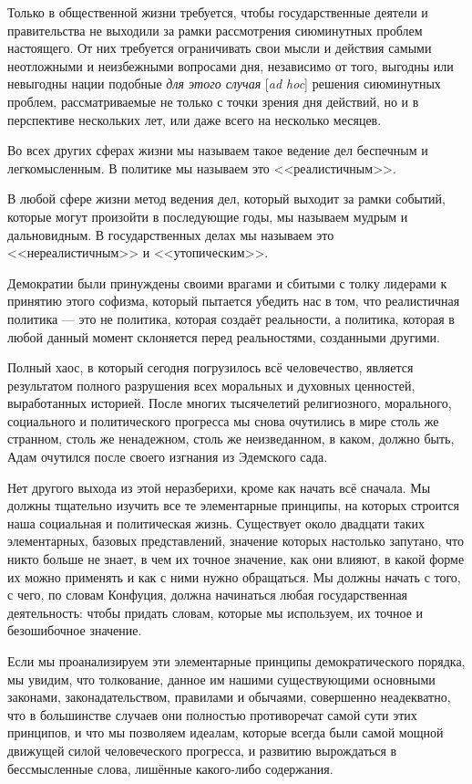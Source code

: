 Только в общественной жизни требуется, чтобы государственные деятели и правительства не выходили за рамки рассмотрения сиюминутных проблем настоящего. От них требуется ограничивать свои мысли и действия самыми неотложными и неизбежными вопросами дня, независимо от того, выгодны или невыгодны нации подобные \textit{для этого случая} [\textit{ad hoc}] решения сиюминутных проблем, рассматриваемые не только с точки зрения дня действий, но и в перспективе нескольких лет, или даже всего на несколько месяцев.

Во всех других сферах жизни мы называем такое ведение дел беспечным и легкомысленным. В политике мы называем это <<реалистичным>>.

В любой сфере жизни метод ведения дел, который выходит за рамки событий, которые могут произойти в последующие годы, мы называем мудрым и дальновидным. В государственных делах мы называем это <<нереалистичным>> и <<утопическим>>.

Демократии были принуждены своими врагами и сбитыми с толку лидерами к принятию этого софизма, который пытается убедить нас в том, что реалистичная политика — это не политика, которая создаёт реальности, а политика, которая в любой данный момент склоняется перед реальностями, созданными другими.

Полный хаос, в который сегодня погрузилось всё человечество, является результатом полного разрушения всех моральных и духовных ценностей, выработанных историей. После многих тысячелетий религиозного, морального, социального и политического прогресса мы снова очутились в мире столь же странном, столь же ненадежном, столь же неизведанном, в каком, должно быть, Адам очутился после своего изгнания из Эдемского сада.

Нет другого выхода из этой неразберихи, кроме как начать всё сначала. Мы должны тщательно изучить все те элементарные принципы, на которых строится наша социальная и политическая жизнь. Существует около двадцати таких элементарных, базовых представлений, значение которых настолько запутано, что никто больше не знает, в чем их точное значение, как они влияют, в какой форме их можно применять и как с ними нужно обращаться. Мы должны начать с того, с чего, по словам Конфуция, должна начинаться любая государственная деятельность: чтобы придать словам, которые мы используем, их точное и безошибочное значение.

Если мы проанализируем эти элементарные принципы демократического порядка, мы увидим, что толкование, данное им нашими существующими основными законами, законадательством, правилами и обычаями, совершенно неадекватно, что в большинстве случаев они полностью противоречат самой сути этих принципов, и что мы позволяем идеалам, которые всегда были самой мощной движущей силой человеческого прогресса, и развитию вырождаться в бессмысленные слова, лишённые какого-либо содержания.

